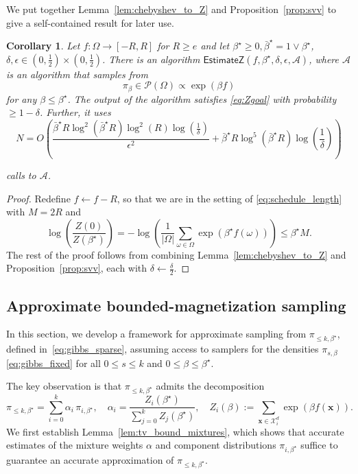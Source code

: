 \documentclass[11pt]{article}
\newtheorem{corollary}{Corollary}
\newcommand{\defeq}{:=}
\newcommand{\eps}{\epsilon}
\newcommand{\half}{\frac{1}{2}}
\newcommand{\1}{\mathbf{1}}
\newcommand{\0}{\mathbf{0}}
\newcommand{\Par}[1]{\left(#1\right)}
\newcommand{\alg}{\mathcal{A}}
\newcommand{\vx}{{\mathbf{x}}}
\newcommand{\calA}{{\mathcal{A}}}
\newcommand{\calP}{{\mathcal{P}}}
\newcommand{\calX}{{\mathcal{X}}}
\newcommand{\EstZ}{\mathsf{EstimateZ}}
\begin{document}
We put together Lemma~\ref{lem:chebyshev_to_Z} and Proposition~\ref{prop:svv} to give a self-contained result for later use.

\begin{corollary}\label{cor:adaptive_sche_range_f}
Let $f: \Omega \to [-R, R]$ for $R \ge e$ and let $\beta^\star \ge 0, \bar{\beta}^\star = 1 \lor \beta^\star$, $\delta, \eps \in (0, \half) \times (0, \half)$. There is an algorithm $\EstZ(f, \beta^\star, \delta, \eps, \calA)$, where $\calA$ is an algorithm that samples from
\[\pi_\beta \in \calP(\Omega) \propto \exp\Par{\beta f}\]
for any $\beta \le \beta^\star$. The output of the algorithm satisfies \eqref{eq:Zgoal} with probability $\ge 1 - \delta$. Further, it uses 
\begin{equation}
    \label{eq:sample_complexity_est_const}
    N = O\Par{\frac{\bar{\beta}^\star R \log^2(\bar{\beta}^\star R)\log^2(R)\log(\frac 1 \delta)}{\eps^2} + \bar{\beta}^\star R \log^5(\bar{\beta}^\star R)\log\Par{\frac 1 \delta}}
\end{equation}

calls to $\alg$.
\end{corollary}
\begin{proof}
Redefine $f \gets f - R$, so that we are in the setting of \eqref{eq:schedule_length} with $M = 2R$ and
\[\log\Par{\frac{Z(0)}{Z(\beta^\star)}} = -\log\Par{\frac 1 {|\Omega|} \sum_{\omega \in \Omega} \exp\Par{\beta^\star f(\omega)}} \le \beta^\star M.\]
The rest of the proof follows from combining Lemma~\ref{lem:chebyshev_to_Z} and Proposition~\ref{prop:svv}, each with $\delta \gets \frac \delta 2$.
\end{proof}
\fi
\subsection{Approximate bounded-magnetization sampling}
\label{ssec:sparse_subsets_annealing}

In this section, we develop a framework for approximate sampling from $\pi_{\le k, \beta^\star}$, defined in~\eqref{eq:gibbs_sparse}, assuming access to samplers for the densities $\pi_{s,\beta}$ \eqref{eq:gibbs_fixed} for all $0 \le s \le k$ and $0 \le \beta \le \beta^\star$. 

The key observation is that $\pi_{\le k, \beta^\star}$ admits the decomposition
\begin{equation}\label{eq:mixture}
\pi_{\le k, \beta^\star}
= \sum_{i=0}^k \alpha_i \, \pi_{i, \beta^\star},
\quad
\alpha_i = \frac{Z_i(\beta^\star)}{\sum_{j=0}^k Z_j(\beta^\star)},\quad Z_i(\beta) \defeq \sum_{\vx \in \calX^d_i}\exp\Par{\beta f(\vx)}.
\end{equation}
We first establish Lemma~\ref{lem:tv_bound_mixtures}, which shows that accurate estimates of the mixture weights $\alpha$ and component distributions $\pi_{i,\beta^\star}$ suffice to guarantee an accurate approximation of $\pi_{\le k, \beta^\star}$.
\end{document}
